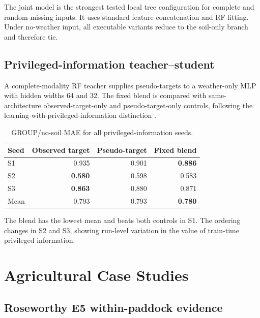 \documentclass[runningheads]{venue/lncs/llncs}
\begin{document}
The joint model is the strongest tested local tree configuration for complete and random-missing inputs. It uses standard feature concatenation and RF fitting. Under no-weather input, all executable variants reduce to the soil-only branch and therefore tie.

\subsection{Privileged-information teacher--student}\label{sec:pi}

A complete-modality RF teacher supplies pseudo-targets to a weather-only MLP with hidden widths 64 and 32. The fixed blend is compared with same-architecture observed-target-only and pseudo-target-only controls, following the learning-with-privileged-information distinction \cite{LopezPaz2016GeneralizedDistillation}.

\begin{table}[h]
\centering
\caption{GROUP/no-soil MAE for all privileged-information seeds.}
\small
\begin{tabular}{lrrr}
\toprule
Seed & Observed target & Pseudo-target & Fixed blend\\
\midrule
S1 & 0.935 & 0.901 & \textbf{0.886}\\
S2 & \textbf{0.580} & 0.598 & 0.583\\
S3 & \textbf{0.863} & 0.880 & 0.871\\
\midrule
Mean & 0.793 & 0.793 & \textbf{0.780}\\
\bottomrule
\end{tabular}
\end{table}

The blend has the lowest mean and beats both controls in S1. The ordering changes in S2 and S3, showing run-level variation in the value of train-time privileged information.

\section{Agricultural Case Studies}\label{sec:secondary-cases}

\subsection{Roseworthy E5 within-paddock evidence}
\end{document}
